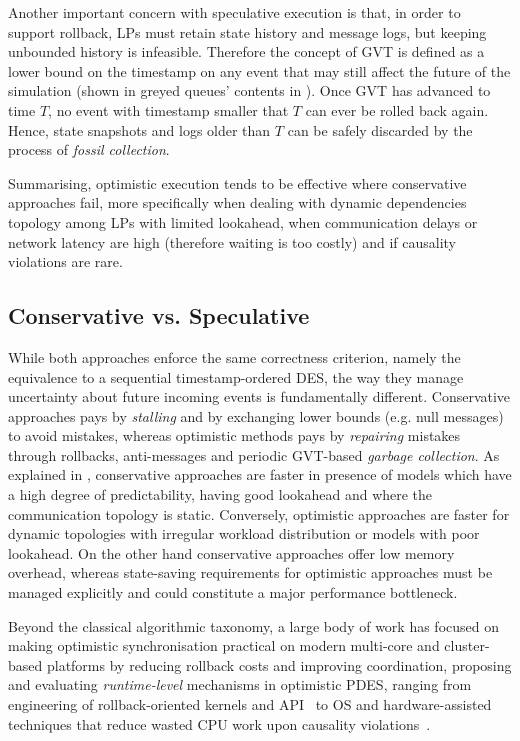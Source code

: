 Another important concern with speculative execution is that, in order to
support rollback, \ac{LP}s must retain state history and message logs, but
keeping unbounded history is infeasible. Therefore the concept of \ac{GVT} is
defined as a lower bound on the timestamp on any event that may still affect
the future of the simulation (shown in greyed queues' contents in
). Once \ac{GVT} has advanced to time $T$, no event
with timestamp smaller that $T$ can ever be rolled back again. Hence, state
snapshots and logs older than $T$ can be safely discarded by the process of
\emph{fossil collection}.
\\
\newline

Summarising, optimistic execution tends to be effective where conservative
approaches fail, more specifically when dealing with dynamic dependencies
topology among \ac{LP}s with limited lookahead, when communication delays or
network latency are high (therefore waiting is too costly) and if causality
violations are rare.

\subsection{Conservative vs. Speculative}

While both approaches enforce the same correctness criterion, namely the
equivalence to a sequential timestamp-ordered \ac{DES}, the way they manage
uncertainty about future incoming events is fundamentally different.
Conservative approaches pays by \emph{stalling} and by exchanging lower bounds
(e.g. null messages) to avoid mistakes, whereas optimistic methods pays by
\emph{repairing} mistakes through rollbacks, anti-messages and periodic
\ac{GVT}-based \emph{garbage collection}.
As explained in \cite{Fujimoto1990PDES}, conservative approaches are faster in
presence of models which have a high degree of predictability, having good
lookahead and where the communication topology is static. Conversely,
optimistic approaches are faster for dynamic topologies with irregular workload
distribution or models with poor lookahead. On the other hand conservative
approaches offer low memory overhead, whereas state-saving requirements for
optimistic approaches must be managed explicitly and could constitute a major
performance bottleneck.

Beyond the classical algorithmic taxonomy, a large body of work has focused on
making optimistic synchronisation practical on modern multi-core and
cluster-based platforms by reducing rollback costs and improving coordination,
proposing and evaluating \emph{runtime-level} mechanisms in optimistic
\ac{PDES}, ranging from engineering of rollback-oriented kernels and
\ac{API}~\cite{pellegrini2012TROSCIPM} to OS and hardware-assisted techniques that
reduce wasted CPU work upon causality violations~\cite{silvestri2020IPI}.

